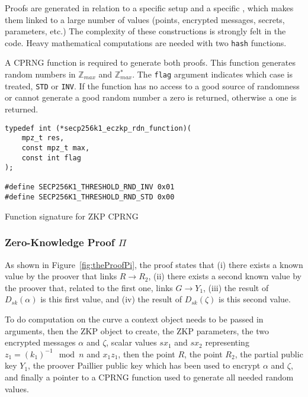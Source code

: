 Proofs are generated in relation to a specific setup and a specific , which makes them linked to a large number of values (points,
encrypted messages, secrets, parameters, etc.) The complexity of these
constructions is strongly felt in the code. Heavy mathematical computations are
needed with two \texttt{hash} functions.

A CPRNG function is required to generate both proofs. This function generates
random numbers in $\mathbb{Z}_{max}$ and $\mathbb{Z}_{max}^*$. The \texttt{flag}
argument indicates which case is treated, \texttt{STD} or \texttt{INV}. If the
function has no access to a good source of randomness or cannot generate a good
random number a zero is returned, otherwise a one is returned.

\begin{listing}
  \begin{verbatim}
typedef int (*secp256k1_eczkp_rdn_function)(
    mpz_t res,
    const mpz_t max,
    const int flag
);

#define SECP256K1_THRESHOLD_RND_INV 0x01
#define SECP256K1_THRESHOLD_RND_STD 0x00
  \end{verbatim}
	\caption{Function signature for ZKP CPRNG}
	\label{lst:funcSigZKPCPRGN}
\end{listing}

\subsubsection{Zero-Knowledge Proof $\Pi$}

As shown in Figure~\ref{fig:theProofPi}, the proof states that (i) there exists a
known value by the proover that links $R \rightarrow R_2$, (ii) there exists a
second known value by the proover that, related to the first one, links $G
\rightarrow Y_1$, (iii) the result of $D_{sk}(\alpha)$ is this first value, and
(iv) the result of $D_{sk}(\zeta)$ is this second value.

To do computation on the curve a context object needs to be passed in arguments,
then the ZKP object to create, the ZKP parameters, the two encrypted messages
$\alpha$ and $\zeta$, scalar values $sx_1$ and $sx_2$ representing $z_1 =
(k_1)^{-1} \mod n$ and $x_1z_1$, then the point $R$, the point $R_2$, the
partial public key $Y_1$, the proover Paillier public key which has been used to
encrypt $\alpha$ and $\zeta$, and finally a pointer to a CPRNG function used to
generate all needed random values.

